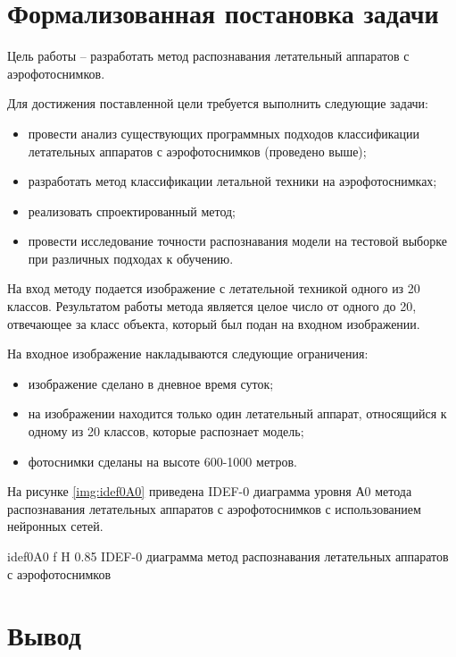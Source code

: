 \section{Формализованная постановка задачи}
Цель работы -- разработать метод распознавания летательный аппаратов с аэрофотоснимков.

Для достижения поставленной цели требуется выполнить следующие задачи:
\begin{itemize}
	\item провести анализ существующих программных подходов классификации летательных аппаратов с аэрофотоснимков (проведено выше);
	\item разработать метод классификации летальной техники на аэрофотоснимках;
	\item реализовать спроектированный метод;
	\item провести исследование точности распознавания модели на тестовой выборке при различных подходах к обучению.
\end{itemize}

На вход методу подается изображение с летательной техникой одного из 20 классов. Результатом работы метода является целое число от одного до 20, отвечающее за класс объекта, который был подан на входном изображении.

На входное изображение накладываются следующие ограничения:
\begin{itemize}
	\item изображение сделано в дневное время суток;
	\item на изображении находится только один летательный аппарат, относящийся к одному из 20 классов, которые распознает модель;
	\item фотоснимки сделаны на высоте 600-1000 метров.
\end{itemize}

На рисунке \ref{img:idef0A0} приведена IDEF-0 диаграмма уровня А0 метода распознавания летательных аппаратов с аэрофотоснимков с использованием нейронных сетей.

{idef0A0} %
{f} %
{H} %
{0.85\textwidth} %
{IDEF-0 диаграмма метод распознавания летательных аппаратов с аэрофотоснимков} %

\section{Вывод}

